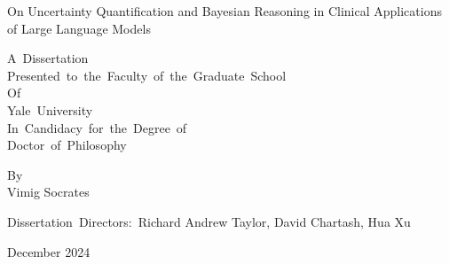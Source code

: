 \begin{titlepage}
	\begin{center}
		
		On Uncertainty Quantification and Bayesian Reasoning in Clinical Applications of Large Language Models
		\par\vfill
		A~Dissertation\\
		Presented~to~the~Faculty~of~the~Graduate~School\\
		Of\\
		Yale~University\\
		In~Candidacy~for~the~Degree~of\\
		Doctor~of~Philosophy
		\par\vfill
		By\\
		Vimig Socrates
		\par\vspace{1.5em}
		Dissertation~Directors:~Richard Andrew Taylor, David Chartash, Hua Xu
		\par\vspace{1.5em}
		December 2024
		\vspace*{1cm}
		
%		
%		
%		
%		
%		
%		
%		
		
	\end{center}
\end{titlepage}
